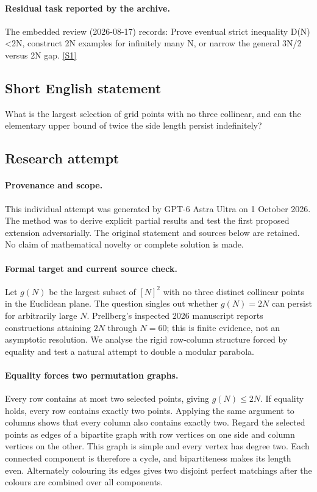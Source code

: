 \documentclass[11pt,a4paper]{article}
\newcommand{\sref}[2]{\hyperlink{source:#1:#2}{[S#2]}}
\begin{document}
\paragraph{Residual task reported by the archive.}

The embedded review (2026-08-17) records: Prove eventual strict inequality D(N)<2N, construct 2N examples for infinitely many N, or narrow the general 3N/2 versus 2N gap. \sref{133}{1}

\subsection{Short English statement}

What is the largest selection of grid points with no three collinear, and can the elementary upper bound of twice the side length persist indefinitely?

\subsection{Research attempt}

\paragraph{Provenance and scope.}
This individual attempt was generated by GPT-6 Astra Ultra on 1 October 2026. The method was to derive explicit partial results and test the first proposed extension adversarially. The original statement and sources below are retained. No claim of mathematical novelty or complete solution is made.

\paragraph{Formal target and current source check.}
Let $g(N)$ be the largest subset of $[N]^2$ with no three distinct collinear points in the Euclidean plane. The question singles out whether $g(N)=2N$ can persist for arbitrarily large $N$. Prellberg's inspected 2026 manuscript reports constructions attaining $2N$ through $N=60$; this is finite evidence, not an asymptotic resolution. We analyse the rigid row-column structure forced by equality and test a natural attempt to double a modular parabola.

\paragraph{Equality forces two permutation graphs.}
Every row contains at most two selected points, giving $g(N)\leq2N$. If equality holds, every row contains exactly two points. Applying the same argument to columns shows that every column also contains exactly two. Regard the selected points as edges of a bipartite graph with row vertices on one side and column vertices on the other. This graph is simple and every vertex has degree two. Each connected component is therefore a cycle, and bipartiteness makes its length even. Alternately colouring its edges gives two disjoint perfect matchings after the colours are combined over all components.
\end{document}
